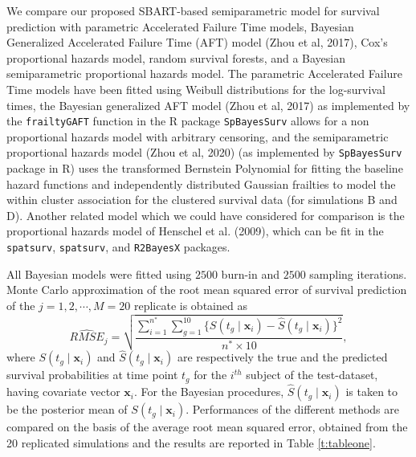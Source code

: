 \documentclass[11pt]{article}
\begin{document}
We compare our proposed SBART-based semiparametric model for survival prediction with parametric Accelerated Failure Time models, Bayesian Generalized Accelerated Failure Time (AFT) model (Zhou et al, 2017), Cox's proportional hazards model, random survival forests, and a Bayesian semiparametric proportional hazards model. The parametric Accelerated Failure Time models have been fitted using Weibull distributions for the log-survival times, the Bayesian generalized AFT model (Zhou et al, 2017) as implemented by the \texttt{frailtyGAFT} function in the R package \texttt{SpBayesSurv} allows for a non proportional hazards model with arbitrary censoring, and the semiparametric proportional hazards model (Zhou et al, 2020) (as implemented by \texttt{SpBayesSurv} package in R) uses the transformed Bernstein Polynomial for fitting the baseline hazard functions and independently distributed Gaussian frailties to model the within cluster association for the clustered survival data (for simulations B and D). Another related model which we could have considered for comparison is the proportional hazards model of Henschel et al. (2009), which can be fit in the \texttt{spatsurv}, \texttt{spatsurv}, and \texttt{R2BayesX} packages.

\normalcolor



All Bayesian models were fitted using $2500$ burn-in and $2500$ sampling iterations. Monte Carlo approximation of the root mean squared error of survival prediction of the $j=1,2,\cdots,M=20$ replicate is obtained as 
 $$
 \hat{RMSE}_j 
 = \sqrt{\frac{\sum_{i=1}^{n^*}\sum_{g=1}^{10}\{S(t_g\mid \mathbf{x}_i)-\hat{S}(t_g\mid \mathbf{x}_i)\}^2}{n^*\times 10}},
 $$ 
 where $S(t_g\mid \mathbf{x}_i)$ and $\hat{S}(t_g\mid \mathbf{x}_i)$ are respectively the true and the predicted survival probabilities at time point $t_g$ for the $i^{th}$ subject of the test-dataset, having covariate vector $\mathbf{x}_i.$ For the Bayesian procedures, $\hat{S}(t_g\mid \mathbf{x}_i)$ is taken to be the posterior mean of $S(t_g\mid \mathbf{x}_i).$ Performances of the different methods are compared on the basis of the average root mean squared error, obtained from the 20 replicated simulations and the results are reported in Table \ref{t:tableone}.
 
\end{document}
